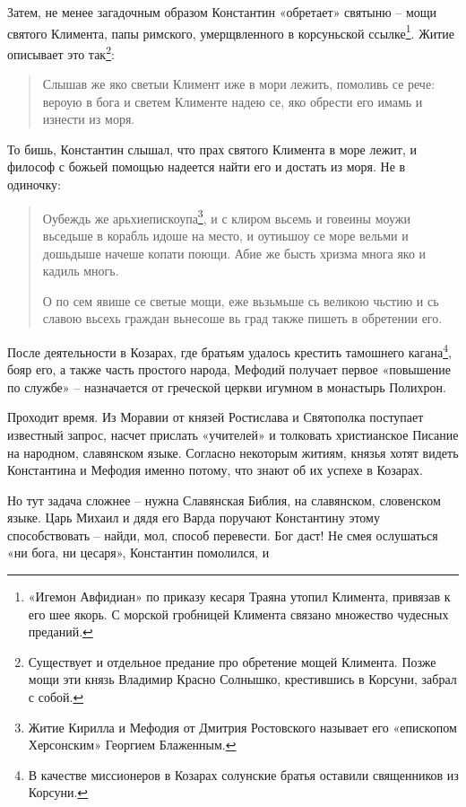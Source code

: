 Затем, не менее загадочным образом Константин «обретает» святыню – мощи святого Климента, папы римского, умерщвленного в корсуньской ссылке\footnote{«Игемон Авфидиан» по приказу кесаря Траяна утопил Климента, привязав к его шее якорь. С морской гробницей Климента связано множество чудесных преданий.}. Житие описывает это так\footnote{Существует и отдельное предание про обретение мощей Климента. Позже мощи эти князь Владимир Красно Солнышко, крестившись в Корсуни, забрал с собой.}:

\begin{quotation}
Слышав же яко светыи Климент иже в мори лежить, помоливь се рече: вероую в бога и светем Клименте надею се, яко обрести его имамь и изнести из моря.
\end{quotation}

То бишь, Константин слышал, что прах святого Климента в море лежит, и философ с божьей помощью надеется найти его и достать из моря. Не в одиночку:

\begin{quotation}
Оубеждь же арьхиепискоупа\footnote{Житие Кирилла и Мефодия от Дмитрия Ростовского называет его «епископом Херсонским» Георгием Блаженным.}, и с клиром вьсемь и говеины моужи вьседьше в корабль идоше на место, и оутиьшоу се море вельми и дошьдыше начеше копати поющи. Абие же бысть хризма многа яко и кадиль многь.

О по сем явише се светые мощи, еже вьзьмьше сь великою чьстию и сь славою вьсехь граждан вьнесоше вь град также пишеть в обретении его.
\end{quotation}

После деятельности в Козарах, где братьям удалось крестить тамошнего кагана\footnote{В качестве миссионеров в Козарах солунские братья оставили священников из Корсуни.}, бояр его, а также часть простого народа, Мефодий получает первое «повышение по службе» – назначается от греческой церкви игумном в монастырь Полихрон.

Проходит время. Из Моравии от князей Ростислава и Святополка поступает известный запрос, насчет прислать «учителей» и толковать христианское Писание на народном, славянском языке. Согласно некоторым житиям, князья хотят видеть Константина и Мефодия именно потому, что знают об их успехе в Козарах.

Но тут задача сложнее – нужна Славянская Библия, на славянском, словенском языке. Царь Михаил и дядя его Варда поручают Константину этому способствовать – найди, мол, способ перевести. Бог даст! Не смея ослушаться «ни бога, ни цесаря», Константин помолился, и 

